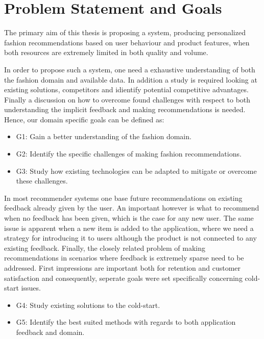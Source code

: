 \section{Problem Statement and Goals}

The primary aim of this thesis is proposing a system, producing personalized
fashion recommendations based on user behaviour and product features, when both
resources are extremely limited in both quality and volume.

In order to propose such a system, one need a exhaustive understanding of both
the fashion domain and available data. In addition a study is required looking
at existing solutions, competitors and idientify potential competitive
advantages. Finally a discussion on how to overcome found challenges with
respect to both understanding the implicit feedback and making recommendations
is needed. Hence, our domain specific goals can be defined as:

\begin{itemize}
	\item G1: Gain a better understanding of the fashion domain.
  \item G2: Identify the specific challenges of making fashion recommendations.
  \item G3: Study how existing technologies can be adapted to mitigate or
  overcome these challenges.
\end{itemize}

In most recommender systems one base future recommendations on existing
feedback already given by the user. An important however is what to recommend
when no feedback has been given, which is the case for any new user. The same
issue is apparent when a new item is added to the application, where we need a
strategy for introducing it to users although the product is not connected to
any existing feedback. Finally, the closely related problem of making
recommendations in scenarios where feedback is extremely sparse need to be
addressed. First impressions are important both for retention and customer
satisfaction and consequently, seperate goals were set specifically concerning
cold-start issues.

\begin{itemize}
  \item G4: Study existing solutions to the cold-start.
  \item G5: Identify the best suited methods with regards to both application
  feedback and domain. 
\end{itemize}

